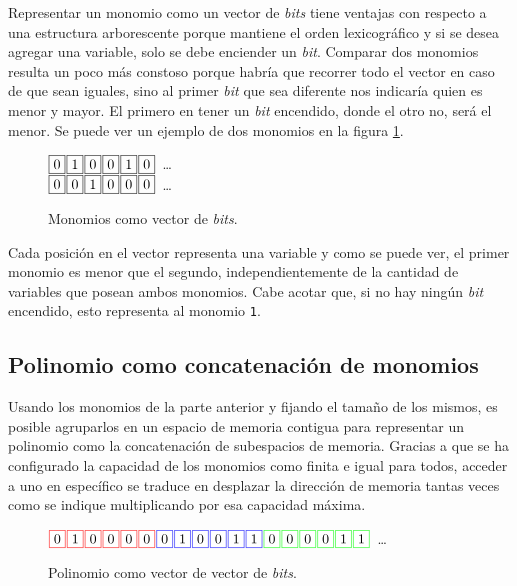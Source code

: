 Representar un monomio como un vector de \textit{bits} tiene ventajas con respecto a una estructura arborescente porque mantiene el orden lexicográfico y si se desea agregar una variable, solo se debe enciender un \textit{bit}. Comparar dos monomios resulta un poco más constoso porque habría que recorrer todo el vector en caso de que sean iguales, sino al primer \textit{bit} que sea diferente nos indicaría quien es menor y mayor. El primero en tener un \textit{bit} encendido, donde el otro no, será el menor. Se puede ver un ejemplo de dos monomios en la figura \ref{fig:mbs}.

\begin{figure}
    \centering\noindent
    $\fbox{0} \hspace*{.1em} \fbox{1} \hspace*{.1em} \fbox{0} \hspace*{.1em} \fbox{0} \hspace*{.1em} \fbox{1} \hspace*{.1em} \fbox{0}$\ \dots\ \\
    \noindent
    $\fbox{0} \hspace*{.1em} \fbox{0} \hspace*{.1em} \fbox{1} \hspace*{.1em} \fbox{0} \hspace*{.1em} \fbox{0} \hspace*{.1em} \fbox{0}$\ \dots\
\caption{Monomios como vector de \textit{bits}.}
\label{fig:mbs}
\end{figure}

Cada posición en el vector representa una variable y como se puede ver, el primer monomio es menor que el segundo, independientemente de la cantidad de variables que posean ambos monomios. Cabe acotar que, si no hay ningún \textit{bit} encendido, esto representa al monomio \texttt{1}.

\subsection{Polinomio como concatenación de monomios}

Usando los monomios de la parte anterior y fijando el tamaño de los mismos, es posible agruparlos en un espacio de memoria contigua para representar un polinomio como la concatenación de subespacios de memoria. Gracias a que se ha configurado la capacidad de los monomios como finita e igual para todos, acceder a uno en específico se traduce en desplazar la dirección de memoria tantas veces como se indique multiplicando por esa capacidad máxima.

\begin{figure}
    \centering\noindent
    $\fcolorbox{red}{white}{0} \sep \fcolorbox{red}{white}{1} \sep \fcolorbox{red}{white}{0} \sep \fcolorbox{red}{white}{0} \sep \fcolorbox{red}{white}{0} \sep \fcolorbox{red}{white}{0} \sep \fcolorbox{blue}{white}{0} \sep \fcolorbox{blue}{white}{1} \sep \fcolorbox{blue}{white}{0} \sep \fcolorbox{blue}{white}{0} \sep \fcolorbox{blue}{white}{1} \sep \fcolorbox{blue}{white}{1} \sep \fcolorbox{green}{white}{0} \sep \fcolorbox{green}{white}{0} \sep \fcolorbox{green}{white}{0} \sep \fcolorbox{green}{white}{0} \sep \fcolorbox{green}{white}{1} \sep \fcolorbox{green}{white}{1}$\ \dots\ \\
\caption{Polinomio como vector de vector de \textit{bits}.}
\label{fig:pbs}
\end{figure}

